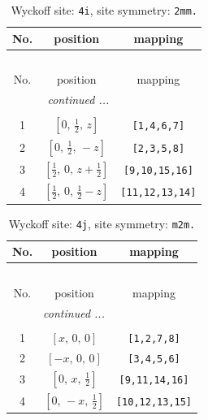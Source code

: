 \documentclass[fleqn,8pt]{jsarticle}
\begin{document}
\renewcommand{\arraystretch}{1.2}
\begin{longtable}{ccc}
\caption{Wyckoff site: {\tt 4i}, site symmetry: {\tt 2mm.}}
 \\
 \hline \hline
No. & position & mapping \\ \hline \endfirsthead

\multicolumn{2}{l}{\tablename\ \thetable{}} \\
 \hline \hline
No. & position & mapping \\ \hline \endhead

 \hline \hline
\multicolumn{2}{r}{\footnotesize\it continued ...} \\ \endfoot

 \hline \hline
\multicolumn{2}{r}{} \\ \endlastfoot

1 & $\left[ 0,\, \frac{1}{2},\, z \right]$ & {\tt [1,4,6,7]} \\ \hline
2 & $\left[ 0,\, \frac{1}{2},\, - z \right]$ & {\tt [2,3,5,8]} \\ \hline
3 & $\left[ \frac{1}{2},\, 0,\, z + \frac{1}{2} \right]$ & {\tt [9,10,15,16]} \\ \hline
4 & $\left[ \frac{1}{2},\, 0,\, \frac{1}{2} - z \right]$ & {\tt [11,12,13,14]} \\
\end{longtable}
\renewcommand{\arraystretch}{1.2}
\begin{longtable}{ccc}
\caption{Wyckoff site: {\tt 4j}, site symmetry: {\tt m2m.}}
 \\
 \hline \hline
No. & position & mapping \\ \hline \endfirsthead

\multicolumn{2}{l}{\tablename\ \thetable{}} \\
 \hline \hline
No. & position & mapping \\ \hline \endhead

 \hline \hline
\multicolumn{2}{r}{\footnotesize\it continued ...} \\ \endfoot

 \hline \hline
\multicolumn{2}{r}{} \\ \endlastfoot

1 & $\left[ x,\, 0,\, 0 \right]$ & {\tt [1,2,7,8]} \\ \hline
2 & $\left[ - x,\, 0,\, 0 \right]$ & {\tt [3,4,5,6]} \\ \hline
3 & $\left[ 0,\, x,\, \frac{1}{2} \right]$ & {\tt [9,11,14,16]} \\ \hline
4 & $\left[ 0,\, - x,\, \frac{1}{2} \right]$ & {\tt [10,12,13,15]} \\
\end{longtable}
\end{document}
